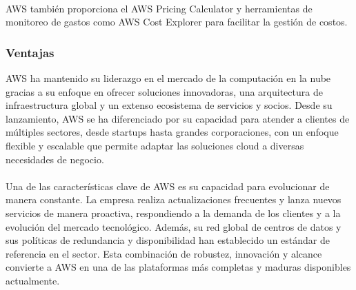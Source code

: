 {                \paragraph{} AWS también proporciona el AWS Pricing Calculator y herramientas de monitoreo de gastos como AWS Cost Explorer para facilitar la gestión de costos.
                
            \subsubsection{Ventajas}
                AWS ha mantenido su liderazgo en el mercado de la computación en la nube gracias a su enfoque en ofrecer soluciones innovadoras, una arquitectura de infraestructura global y un extenso ecosistema de servicios y socios. Desde su lanzamiento, AWS se ha diferenciado por su capacidad para atender a clientes de múltiples sectores, desde startups hasta grandes corporaciones, con un enfoque flexible y escalable que permite adaptar las soluciones cloud a diversas necesidades de negocio.

                \paragraph{}Una de las características clave de AWS es su capacidad para evolucionar de manera constante. La empresa realiza actualizaciones frecuentes y lanza nuevos servicios de manera proactiva, respondiendo a la demanda de los clientes y a la evolución del mercado tecnológico. Además, su red global de centros de datos y sus políticas de redundancia y disponibilidad han establecido un estándar de referencia en el sector. Esta combinación de robustez, innovación y alcance convierte a AWS en una de las plataformas más completas y maduras disponibles actualmente.
                
}
